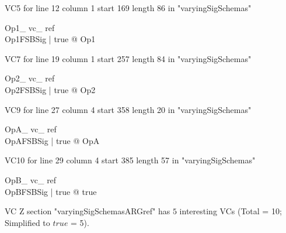 \documentclass{article}
\begin{document}
VC5 for line 12 column 1 start 169 length 86 in "varyingSigSchemas"
\begin{theorem}{ Op1\_ vc\_ ref}\\
 \forall Op1FSBSig | true @ \pre Op1 \\

\end{theorem}

VC7 for line 19 column 1 start 257 length 84 in "varyingSigSchemas"
\begin{theorem}{ Op2\_ vc\_ ref}\\
 \forall Op2FSBSig | true @ \pre Op2 \\

\end{theorem}

VC9 for line 27 column 4 start 358 length 20 in "varyingSigSchemas"
\begin{theorem}{ OpA\_ vc\_ ref}\\
 \forall OpAFSBSig | true @ \pre OpA \\

\end{theorem}

VC10 for line 29 column 4 start 385 length 57 in "varyingSigSchemas"
\begin{theorem}{ OpB\_ vc\_ ref}\\
 \exists OpBFSBSig | true @ true \\

\end{theorem}



 VC Z section "varyingSigSchemasARGref" has $5$ interesting VCs (Total = 10; Simplified to $true$ = 5).



\end{document}
